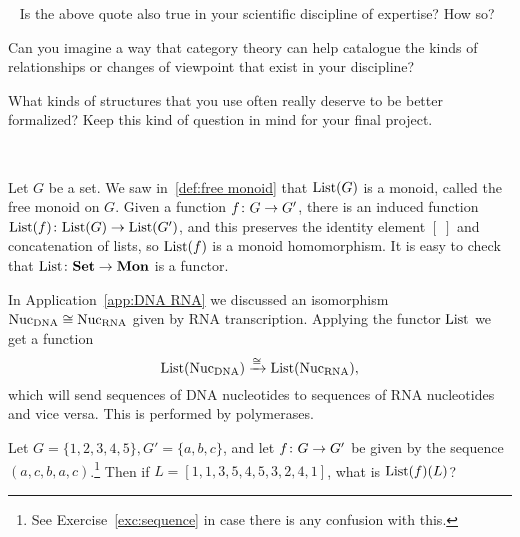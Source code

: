 \documentclass[CT4S-EN-RU]{subfiles}
\begin{document}
\begin{remarkRUS}
\end{remarkRUS}

\begin{exerciseENG}~
\sexc Is the above quote also true in your scientific discipline of expertise? How so? 
\item Can you imagine a way that category theory can help catalogue the kinds of relationships or changes of viewpoint that exist in your discipline? 
\item What kinds of structures that you use often really deserve to be better formalized?
\endsexc
Keep this kind of question in mind for your final project.
\end{exerciseENG}

\begin{exerciseRUS}~
\end{exerciseRUS}

\begin{exampleENG}\label{ex:free monoid}
Let $G$ be a set. We saw in~\ref{def:free monoid} that $\textnormal{List}(G)$ is a monoid, called the free monoid on $G$. Given a function $f\colon G\rightarrow G'$, there is an induced function $\textnormal{List}(f)\colon\textnormal{List}(G)\rightarrow\textnormal{List}(G')$, and this preserves the identity element $[\;]$ and concatenation of lists, so $\textnormal{List}(f)$ is a monoid homomorphism. It is easy to check that $\textnormal{List}\colon{\mathbf{Set}}\rightarrow{\mathbf{Mon}}$ is a functor.
\end{exampleENG}

\begin{exampleRUS}\label{ex:free monoid}
\end{exampleRUS}

\begin{applicationENG}\label{app:polymerase}
In Application~\ref{app:DNA RNA} we discussed an isomorphism $\textnormal{Nuc}_\textnormal{DNA}\cong\textnormal{Nuc}_\textnormal{RNA}$ given by RNA transcription. Applying the functor $\textnormal{List}$ we get a function $$\textnormal{List}(\textnormal{Nuc}_\textnormal{DNA})\xrightarrow{\cong}\textnormal{List}(\textnormal{Nuc}_\textnormal{RNA}),$$ which will send sequences of DNA nucleotides to sequences of RNA nucleotides and vice versa. This is performed by polymerases.
\end{applicationENG}

\begin{applicationRUS}\label{app:polymerase}
\end{applicationRUS}

\begin{exerciseENG}\label{exc:list as functor}
Let $G=\{1,2,3,4,5\}, G'=\{a,b,c\}$, and let $f\colon G\rightarrow G'$ be given by the sequence $(a,c,b,a,c)$.\footnote{See Exercise~\ref{exc:sequence} in case there is any confusion with this.} Then if $L=[1,1,3,5,4,5,3,2,4,1]$, what is $\textnormal{List}(f)(L)$?
\end{exerciseENG}
\end{document}
